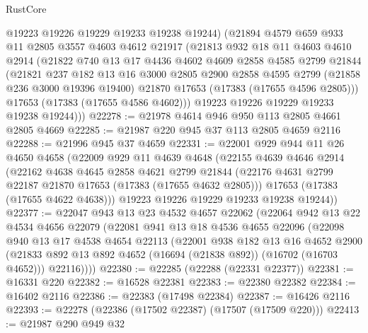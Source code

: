 \begin{lexlean}{RustCore}
\begin{coremodule}
        @19223
        @19226
        @19229
        @19233
        @19238
        @19244)
      (@21894
        @4579
        @659
        @933
        @11
        @2805
        @3557
        @4603
        @4612
        @21917
        (@21813
          @932
          @18
          @11
          @4603
          @4610
          @2914
          (@21822
            @740
            @13
            @17
            @4436
            @4602
            @4609
            @2858
            @4585
            @2799
            @21844
            (@21821
              @237
              @182
              @13
              @16
              @3000
              @2805
              @2900
              @2858
              @4595
              @2799
              (@21858 @236 @3000 @19396 @19400)
              @21870
              @17653
              (@17383 (@17655 @4596 @2805)))
            @17653
            (@17383 (@17655 @4586 @4602)))
          @19223
          @19226
          @19229
          @19233
          @19238
          @19244)))
@22278 := @21978 @4614 @946 @950 @113 @2805 @4661 @2805 @4669
@22285 := @21987 @220 @945 @37 @113 @2805 @4659 @2116
@22288 := @21996 @945 @37 @4659
@22331 := @22001
    @929
    @944
    @11
    @26
    @4650
    @4658
    (@22009
      @929
      @11
      @4639
      @4648
      (@22155
        @4639
        @4646
        @2914
        (@22162
          @4638
          @4645
          @2858
          @4621
          @2799
          @21844
          (@22176 @4631 @2799 @22187 @21870 @17653 (@17383 (@17655 @4632 @2805)))
          @17653
          (@17383 (@17655 @4622 @4638)))
        @19223
        @19226
        @19229
        @19233
        @19238
        @19244))
@22377 := @22047
    @943
    @13
    @23
    @4532
    @4657
    @22062
    (@22064
      @942
      @13
      @22
      @4534
      @4656
      @22079
      (@22081
        @941
        @13
        @18
        @4536
        @4655
        @22096
        (@22098
          @940
          @13
          @17
          @4538
          @4654
          @22113
          (@22001
            @938
            @182
            @13
            @16
            @4652
            @2900
            (@21833 @892 @13 @892 @4652 (@16694 (@21838 @892)) (@16702 (@16703 @4652)))
            @22116))))
@22380 := @22285 (@22288 (@22331 @22377))
@22381 := @16331 @220
@22382 := @16528 @22381
@22383 := @22380 @22382
@22384 := @16402 @2116
@22386 := @22383 (@17498 @22384)
@22387 := @16426 @2116
@22393 := @22278 (@22386 (@17502 @22387) (@17507 (@17509 @220)))
@22413 := @21987
    @290
    @949
    @32

\end{coremodule}
\end{lexlean}
